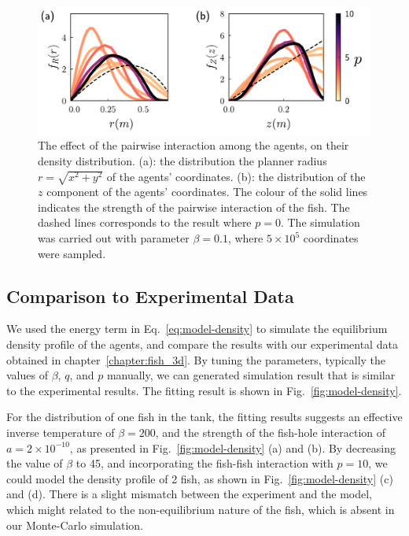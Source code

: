 \documentclass[11pt,twoside]{report}
\begin{document}
\begin{figure}
  \includegraphics[width=\linewidth]{density-interaction}
  \caption[The effect of the pairwise interaction on the density distribution]{
  The effect of the pairwise interaction among the agents, on their density distribution.
  (a): the distribution the planner radius $r=\sqrt{x^2 + y^2}$ of the agents' coordinates.
  (b): the distribution of the $z$ component of the agents' coordinates.
  The colour of the solid lines indicates the strength of the pairwise interaction of the fish. The dashed lines corresponds to the result where $p=0$. The simulation was carried out with parameter $\beta=0.1$, where $5 \times 10^{5}$ coordinates were sampled.
  }
  \label{fig:dist-interaction}
\end{figure}



\subsection{Comparison to Experimental Data}


We used the energy term in Eq.~\ref{eq:model-density} to simulate the equilibrium density profile of the agents, and compare the results with our experimental data obtained in chapter~\ref{chapter:fish_3d}. By tuning the parameters, typically the values of $\beta$, $q$, and $p$ manually, we can generated simulation result that is similar to the experimental results. The fitting result is shown in Fig.~\ref{fig:model-density}.

For the distribution of one fish in the tank, the fitting results suggests an effective inverse temperature of $\beta = 200$, and the strength of the fish-hole interaction of $a = 2\times 10^{-10}$, as presented in Fig.~\ref{fig:model-density} (a) and (b). By decreasing the value of $\beta$ to 45, and incorporating the fish-fish interaction with $p = 10$, we could model the density profile of 2 fish, as shown in Fig.~\ref{fig:model-density} (c) and (d). There is a slight mismatch between the experiment and the model, which might related to the non-equilibrium nature of the fish, which is absent in our Monte-Carlo simulation.
 
\end{document}
